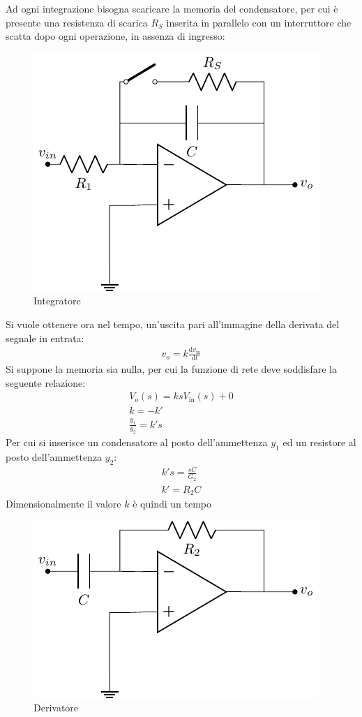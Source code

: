 \documentclass{article}
\newcommand{\df}{\mathrm{d}}
\numberwithin{equation}{subsection}
\begin{document}
Ad ogni integrazione bisogna scaricare la memoria del condensatore, per cui è presente una resistenza di scarica $R_S$ inserita in parallelo con un 
interruttore che scatta dopo ogni operazione, in assenza di ingresso:
\begin{figure}[H]%
    \centering
    \includegraphics{amplificatore-integratore.pdf}%
    \caption{Integratore}
    \label{amplificatore-integratore}
\end{figure}    


Si vuole ottenere ora nel tempo, un'uscita pari all'immagine della derivata del segnale in entrata:
\begin{gather*}
    v_{o}=k\displaystyle\frac{\df v_\mathrm{in}}{\df t}
\end{gather*}
Si suppone la memoria sia nulla, per cui la funzione di rete deve soddisfare la seguente relazione:
\begin{gather*}
    V_o(s)=ksV_\mathrm{in}(s)+0\\
    k=-k'\\
    \displaystyle\frac{y_1}{y_2}=k's
\end{gather*}
Per cui si inserisce un condensatore al posto dell'ammettenza $y_1$ ed un resistore al posto dell'ammettenza $y_2$:
\begin{gather*}
    k's=\displaystyle\frac{sC}{G_2}\\
    k'=R_2C
\end{gather*}
Dimensionalmente il valore $k$ è quindi un tempo  

\begin{figure}[H]%
    \centering
    \includegraphics{amplificatore-derivatore.pdf}%
    \caption{Derivatore}
    \label{amplificatore-derivatore}
\end{figure}
\end{document}
